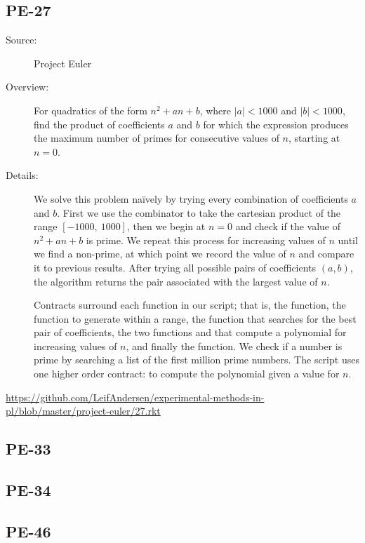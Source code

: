 \subsection*{PE-27~\hrulefill}
\begin{description}
\item[Source:] Project Euler
\item[Overview:] For quadratics of the form $n^2 + an + b$, where $|a| < 1000$ and $|b| < 1000$, find the product of coefficients $a$ and $b$ for which the expression produces the maximum number of primes for consecutive values of $n$, starting at $n=0$.
\item[Details:] 
  We solve this problem na\"ively by trying every combination of coefficients $a$ and $b$.
  First we use the  combinator to take the cartesian product of the range $[-1000,~1000]$, then we begin at $n=0$ and check if the value of $n^2 + an + b$ is prime.
  We repeat this process for increasing values of $n$ until we find a non-prime, at which point we record the value of $n$ and compare it to previous results.
  After trying all possible pairs of coefficients $(a,b)$, the algorithm returns the pair associated with the largest value of $n$.

  Contracts surround each function in our script; that is, the  function, the function to generate  within a range, the function  that searches for the best pair of coefficients, the two functions  and  that compute a polynomial for increasing values of $n$, and finally the  function.
  We check if a number is prime by searching a list of the first million prime numbers.
  The script uses one higher order contract: to compute the polynomial given a value for $n$.
\end{description}
\url{https://github.com/LeifAndersen/experimental-methods-in-pl/blob/master/project-euler/27.rkt}

\subsection*{PE-33~\hrulefill}
\subsection*{PE-34~\hrulefill}
\subsection*{PE-46~\hrulefill}
